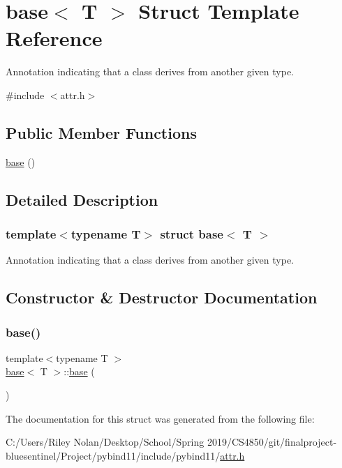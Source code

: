 \hypertarget{structbase}{}\section{base$<$ T $>$ Struct Template Reference}
\label{structbase}


Annotation indicating that a class derives from another given type.  




{\ttfamily \#include $<$attr.\+h$>$}

\subsection*{Public Member Functions}
\begin{DoxyCompactItemize}
\item 
\mbox{\hyperlink{structbase_a90cbe6d9b2100b3aa6012f1d20d0b3c4}{base}} ()
\end{DoxyCompactItemize}


\subsection{Detailed Description}
\subsubsection*{template$<$typename T$>$\newline
struct base$<$ T $>$}

Annotation indicating that a class derives from another given type. 

\subsection{Constructor \& Destructor Documentation}
\mbox{\label{structbase_a90cbe6d9b2100b3aa6012f1d20d0b3c4}} 
\subsubsection{\texorpdfstring{base()}{base()}}
{\footnotesize\ttfamily template$<$typename T $>$ \\
\mbox{\hyperlink{structbase}{base}}$<$ T $>$\+::\mbox{\hyperlink{structbase}{base}} (\begin{DoxyParamCaption}{ }\end{DoxyParamCaption})\hspace{0.3cm}{\ttfamily [inline]}}



The documentation for this struct was generated from the following file\+:\begin{DoxyCompactItemize}
\item 
C\+:/\+Users/\+Riley Nolan/\+Desktop/\+School/\+Spring 2019/\+C\+S4850/git/finalproject-\/bluesentinel/\+Project/pybind11/include/pybind11/\mbox{\hyperlink{attr_8h}{attr.\+h}}\end{DoxyCompactItemize}
